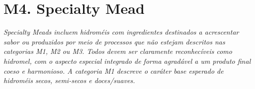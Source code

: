 \section*{M4. Specialty Mead}

\textit{Specialty Meads incluem hidroméis com ingredientes destinados a acrescentar sabor ou produzidos por meio de processos que não estejam descritos nas categorias M1, M2 ou M3. Todos devem ser claramente reconhecíveis como hidromel, com o aspecto especial integrado de forma agradável a um produto final coeso e harmonioso. A categoria M1 descreve o caráter base esperado de hidroméis secos, semi-secos e doces/suaves.}